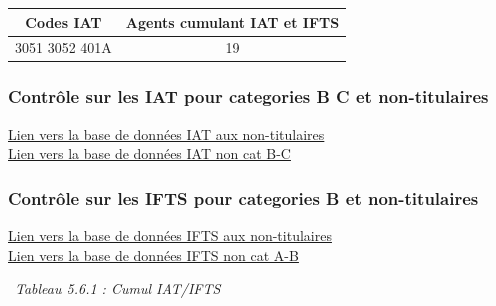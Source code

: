 \begin{longtable}[]{@{}cc@{}}
\toprule
Codes IAT & Agents cumulant IAT et IFTS\tabularnewline
\midrule
\endhead
3051 3052 401A & 19\tabularnewline
\bottomrule
\end{longtable}

\hypertarget{controle-sur-les-iat-pour-categories-b-c-et-non-titulaires}{%
\subsubsection{Contrôle sur les IAT pour categories B C et
non-titulaires}\label{controle-sur-les-iat-pour-categories-b-c-et-non-titulaires}}

\href{../Bases/Reglementation/IAT.non.tit.csv}{Lien vers la base de données
IAT aux non-titulaires}\\
\href{../Bases/Reglementation/IAT.non.catBC.csv}{Lien vers la base de
données IAT non cat B-C}

\hypertarget{controle-sur-les-ifts-pour-categories-b-et-non-titulaires}{%
\subsubsection{Contrôle sur les IFTS pour categories B et
non-titulaires}\label{controle-sur-les-ifts-pour-categories-b-et-non-titulaires}}

\href{../Bases/Reglementation/IFTS.non.tit.csv}{Lien vers la base de
données IFTS aux non-titulaires}\\
\href{../Bases/Reglementation/IFTS.non.catAB.csv}{Lien vers la base de
données IFTS non cat A-B}

~\emph{Tableau 5.6.1 : Cumul IAT/IFTS}

